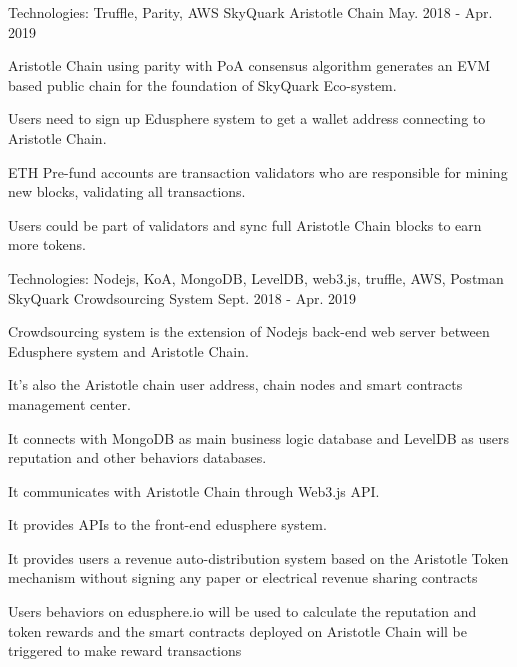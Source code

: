 \begin{cventries}
\cventry
    {Technologies: \quad Truffle, Parity, AWS
    }
    {SkyQuark Aristotle Chain}
    {}
    {May. 2018 - Apr. 2019}
    {
      \begin{cvitems}
        \item {Aristotle Chain using parity with PoA consensus algorithm generates an EVM based public chain for the foundation of SkyQuark Eco-system.}
        \item {Users need to sign up Edusphere system to get a wallet address connecting to Aristotle Chain.}
        \item {ETH Pre-fund accounts are transaction validators who are responsible for mining new blocks, validating all transactions.}
        \item {Users could be part of validators and sync full Aristotle Chain blocks to earn more tokens.}
      \end{cvitems}
    }
    
\cventry
    {Technologies: \quad Nodejs, KoA, MongoDB, LevelDB, web3.js, truffle, AWS, Postman
    }
    {SkyQuark Crowdsourcing System}
    {}
    {Sept. 2018 - Apr. 2019}
    {
      \begin{cvitems}
        \item {Crowdsourcing system is the extension of Nodejs back-end web server between Edusphere system and Aristotle Chain.}
        \item {It's also the Aristotle chain user address, chain nodes and smart contracts   management center.}
        \item {It connects with MongoDB as main business logic database and LevelDB as users reputation and other behaviors databases.}
        \item {It communicates with Aristotle Chain through Web3.js API.}
        \item {It provides APIs to the front-end edusphere system.}
        \item {It provides users a revenue auto-distribution system based on the Aristotle Token mechanism without signing any paper or electrical revenue sharing contracts}
        \item {Users behaviors on edusphere.io will be used to calculate the reputation and token rewards and the smart contracts deployed on Aristotle Chain will be triggered to make reward transactions}
      \end{cvitems}
    }


\end{cventries}
